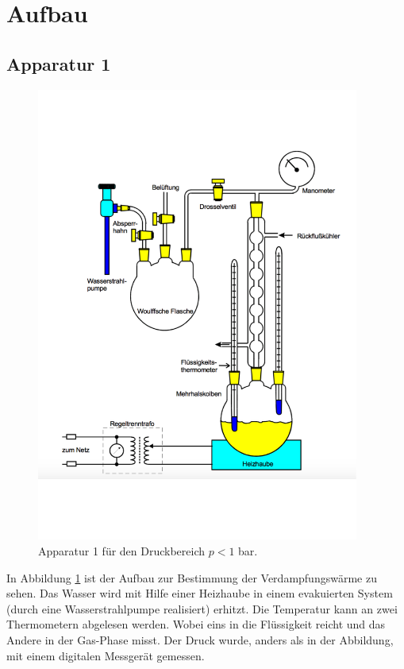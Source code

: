 \section{Aufbau}
\subsection{Apparatur 1}

  \begin{figure}[h!]
    \centering
    \includegraphics[height = 15cm]{Apparatur1.pdf}
    \caption{Apparatur 1 für den Druckbereich $p < 1$ \si{bar}.}
    \label{fig: Apparatur1}
  \end{figure}

\FloatBarrier

In Abbildung \ref{fig: Apparatur1} ist der Aufbau zur Bestimmung der Verdampfungswärme zu sehen.
Das Wasser wird mit Hilfe einer Heizhaube in einem evakuierten System (durch eine Wasserstrahlpumpe
realisiert) erhitzt. Die Temperatur kann
an zwei Thermometern abgelesen werden. Wobei eins in die Flüssigkeit reicht und das Andere in der
Gas-Phase misst. Der Druck wurde, anders als in der Abbildung, mit einem digitalen Messgerät gemessen.

